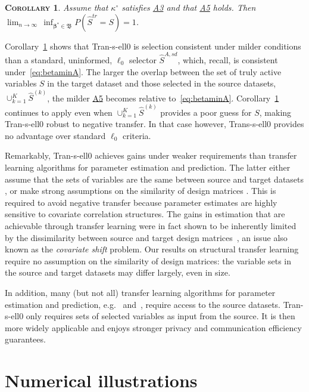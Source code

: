 \documentclass[
  12pt]{article}
\newcommand{\bbeta}{\boldsymbol{\beta}}
\newtheorem{cor}[thm]{\textsc{Corollary}}
\begin{document}
\begin{cor}\label{cor:TLconsist}
    Assume that $\kappa^{\circ}$ satisfies \hyperlink{lab:A3}{A3} and that \hyperlink{lab:A5}{A5} holds. Then $\lim_{n \to \infty} \,\inf_{\bbeta^*\in\mathfrak{B}}P(\hat{S}^{tr} = S) = 1$.
\end{cor}
Corollary~\ref{cor:TLconsist} shows that Tran-s-ell0 is selection consistent under milder conditions than a standard, uninformed, $\ell_0$ selector $\hat S^{A,sd}$, which, recall, is consistent under~\eqref{eq:betaminA}. The larger the overlap between the set of truly active variables $S$ in the target dataset and those selected in the source datasets, $\cup_{k=1}^K\hat S^{(k)}$,
the milder \hyperlink{lab:A5}{A5} becomes relative to~\eqref{eq:betaminA}.
Corollary~\ref{cor:TLconsist} continues to apply even when $\cup_{k=1}^K\hat S^{(k)}$ provides a poor guess for $S$, making Tran-s-ell0 robust to negative transfer. In that case however, Trans-s-ell0 provides no advantage over standard $\ell_0$ criteria.

Remarkably, Tran-s-ell0 achieves gains under weaker requirements than transfer learning algorithms for parameter estimation and prediction. The latter either assume that the sets of variables are the same between source and target datasets \citep{abba2024}, or make strong assumptions on the similarity of design matrices \citep{Li2021,Tian2023}. This is required to avoid negative transfer because parameter estimates are highly sensitive to covariate correlation structures. The gains in estimation that are achievable through transfer learning were in fact shown to be inherently limited by the dissimilarity between source and target design matrices~\citep{liu2025}, an issue also known as the \textit{covariate shift} problem. Our results on structural transfer learning require no assumption on the similarity of design matrices: the variable sets in the source and target datasets may differ largely, even in size.

In addition, many (but not all) transfer learning algorithms for parameter estimation and prediction, e.g.~\cite{Jiang2016} and~\cite{Li2021}, require access to the source datasets. Tran-s-ell0 only requires sets of selected variables as input from the source. It is then more widely applicable and enjoys stronger privacy and communication efficiency guarantees. 

\section{Numerical illustrations}\label{sec:examplesinforml0}
\end{document}
